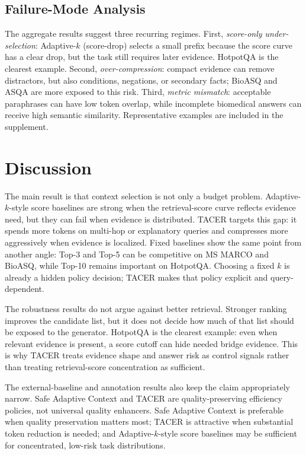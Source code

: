 \documentclass[11pt]{article}
\begin{document}
\subsection{Failure-Mode Analysis}

The aggregate results suggest three recurring regimes. First, \emph{score-only under-selection}: Adaptive-$k$ (score-drop) selects a small prefix because the score curve has a clear drop, but the task still requires later evidence. HotpotQA is the clearest example. Second, \emph{over-compression}: compact evidence can remove distractors, but also conditions, negations, or secondary facts; BioASQ and ASQA are more exposed to this risk. Third, \emph{metric mismatch}: acceptable paraphrases can have low token overlap, while incomplete biomedical answers can receive high semantic similarity. Representative examples are included in the supplement.

\FloatBarrier

\section{Discussion}

The main result is that context selection is not only a budget problem. Adaptive-$k$-style score baselines are strong when the retrieval-score curve reflects evidence need, but they can fail when evidence is distributed. TACER targets this gap: it spends more tokens on multi-hop or explanatory queries and compresses more aggressively when evidence is localized. Fixed baselines show the same point from another angle: Top-3 and Top-5 can be competitive on MS MARCO and BioASQ, while Top-10 remains important on HotpotQA. Choosing a fixed $k$ is already a hidden policy decision; TACER makes that policy explicit and query-dependent.

The robustness results do not argue against better retrieval. Stronger ranking improves the candidate list, but it does not decide how much of that list should be exposed to the generator. HotpotQA is the clearest example: even when relevant evidence is present, a score cutoff can hide needed bridge evidence. This is why TACER treats evidence shape and answer risk as control signals rather than treating retrieval-score concentration as sufficient.

The external-baseline and annotation results also keep the claim appropriately narrow. Safe Adaptive Context and TACER are quality-preserving efficiency policies, not universal quality enhancers. Safe Adaptive Context is preferable when quality preservation matters most; TACER is attractive when substantial token reduction is needed; and Adaptive-$k$-style score baselines may be sufficient for concentrated, low-risk task distributions.
\end{document}
